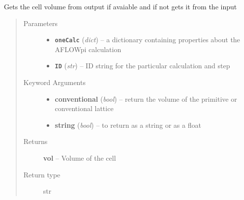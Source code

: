 \documentclass[letterpaper,10pt,english]{sphinxmanual}
\begin{document}
\begin{fulllineitems}
\label{retr:retr.getCellVolume}
Gets the cell volume from output if avaiable and if not gets it from the input
\begin{quote}\begin{description}
\item[{Parameters}] \leavevmode\begin{itemize}
\item {} 
\textbf{\texttt{oneCalc}} (\emph{dict}) -- a dictionary containing properties about the AFLOWpi calculation

\item {} 
\textbf{\texttt{ID}} (\emph{str}) -- ID string for the particular calculation and step

\end{itemize}

\item[{Keyword Arguments}] \leavevmode\begin{itemize}
\item {} 
\textbf{conventional} (\emph{bool}) --
return the volume of the primitive or conventional lattice

\item {} 
\textbf{string} (\emph{bool}) --
to return as a string or as a float

\end{itemize}

\item[{Returns}] \leavevmode
\textbf{vol} --
Volume of the cell

\item[{Return type}] \leavevmode
str

\end{description}\end{quote}

\end{fulllineitems}

\end{document}

